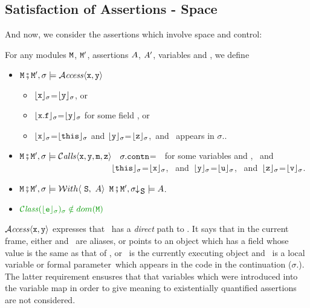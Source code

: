 \subsection{Satisfaction of Assertions - Space}
And now, we consider the assertions which involve space and  control:

\begin{definition}  \label{def:valid:assertion:space}
For any modules $\M$, $\M'$, assertions $\A$, $\A'$, variables  and , we define
\begin{itemize}
\item
$\M\mkpair \M', \sigma \models  \CanAccess{\prg{x}}{\prg{y}}$   \IFF  \begin{itemize}
\item
$\interp {\x} {\sigma}$=$\interp {\y} {\sigma}$, or
\item
$\interp {\x.\f} {\sigma}$=$\interp {\y} {\sigma}$  for some field ,  or
\item
$\interp {\x} {\sigma}$=$\interp {\this} {\sigma}$ and
  $\interp {\y} {\sigma}$=$\interp {\z} {\sigma}$,\ 
and \z\ appears in  $\sigma$..
 \end{itemize}
   \item
$\M\mkpair \M', \sigma \models  \Calls{\prg{x},\prg{y},\prg{m},\prg{z}}$ \IFF \
 $\sigma.\prg{contn}$=\ \ for some variables  and ,  \ and \
\\ $\strut ~ \hspace{1.4in} $
$\interp{\prg{this}}{\sigma}$=$\interp{\prg{x}}{\sigma}$, \ and\ $\interp{\prg{y}}{\sigma}$=$\interp{\prg{u}}{\sigma}$,
 \ and\ $\interp{\prg{z}}{\sigma}$=$\interp{\prg{v}}{\sigma}$.
 \item
 $\M\mkpair \M', \sigma \models \Using {\A} {\prg{S}}$
 \IFF
 $\M\mkpair \M', \restrct \sigma {\prg{S}} \models  \A  $.
 \item
  \IFF
$\sd{ {\ClassOf {\interp{\SE}{\sigma}}{\sigma}}\notin dom(\M)}$
\end{itemize}
\end{definition}
 
$\CanAccess{\prg{x}}{\prg{y}}$ expresses that \x\, has a {\em direct} path to \y.
It says that in the current frame,
either \x and \y\, are  aliases, or \x points to an object which has a field
whose value is the same as that of \y, or \x\, is the currently executing object and \y\, is
 a local variable or formal parameter \z\,which appears in the code in the continuation ($\sigma$.).
The latter requirement ensusres that  that variables which were introduced into the variable map  
in order to give meaning to existentially quantified assertions are not considered.

